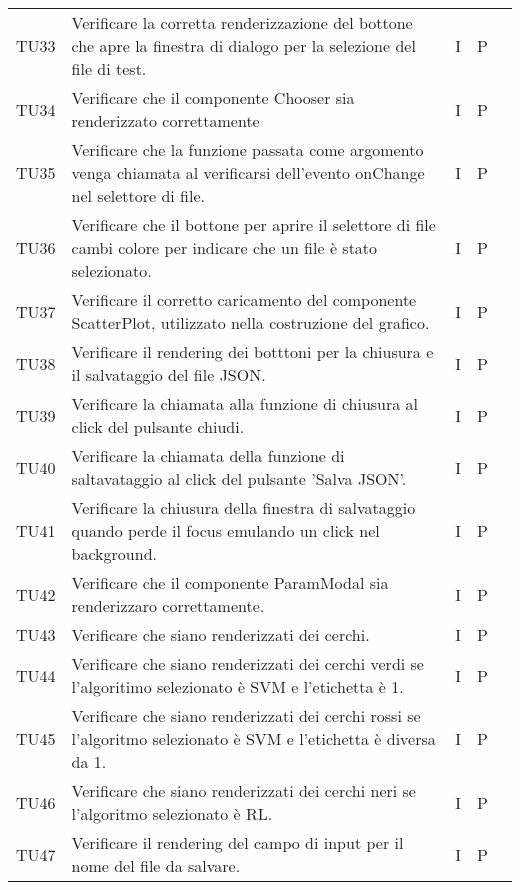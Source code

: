 \begin{longtable} {
		>{}p{15mm} 
		>{}p{79.5mm}
		>{}p{15mm} 
		>{}p{15mm}
		>{}p{0mm}}
	TU33    	& Verificare la corretta renderizzazione del bottone che apre la finestra di dialogo per la selezione del file di test. & I & P &\TBstrut \\ [2mm]
	TU34		& Verificare che il componente Chooser sia renderizzato correttamente& I & P &\TBstrut \\ [2mm]
	TU35    	& Verificare che la funzione passata come argomento venga chiamata al verificarsi dell'evento onChange nel selettore di file. & I & P &\TBstrut \\ [2mm]
	TU36    	& Verificare che il bottone per aprire il selettore di file cambi colore per indicare che un file è stato selezionato. & I & P &\TBstrut \\ [2mm]
	
	TU37    	& Verificare il corretto caricamento del componente ScatterPlot, utilizzato nella costruzione del grafico. & I & P &\TBstrut \\ [2mm]
	TU38    	& Verificare il rendering dei botttoni per la chiusura e il salvataggio del file JSON. & I & P &\TBstrut \\ [2mm]
	TU39    	& Verificare la chiamata alla funzione di chiusura al click del pulsante chiudi. & I & P &\TBstrut \\ [2mm]
	TU40    	& Verificare la chiamata della funzione di saltavataggio al click del pulsante 'Salva JSON'. & I & P &\TBstrut \\ [2mm]
	TU41    	& Verificare la chiusura della finestra di salvataggio quando perde il focus emulando un click nel background. & I & P &\TBstrut \\ [2mm]
	TU42		& Verificare che il componente ParamModal sia renderizzaro correttamente. & I & P &\TBstrut \\ [2mm]
	TU43		& Verificare che siano renderizzati dei cerchi.& I & P &\TBstrut \\ [2mm]
	TU44		& Verificare che siano renderizzati dei cerchi verdi se l'algoritimo selezionato è SVM e l'etichetta è 1.& I & P &\TBstrut \\ [2mm]
	TU45		& Verificare che siano renderizzati dei cerchi rossi se l'algoritmo selezionato è SVM e l'etichetta è diversa da 1.& I & P &\TBstrut \\ [2mm]
	TU46		& Verificare che siano renderizzati dei cerchi neri se l'algoritmo selezionato è RL.& I & P &\TBstrut \\ [2mm]
	TU47    	& Verificare il rendering del campo di input per il nome del file da salvare. & I & P &\TBstrut \\ [2mm]

\end{longtable}
